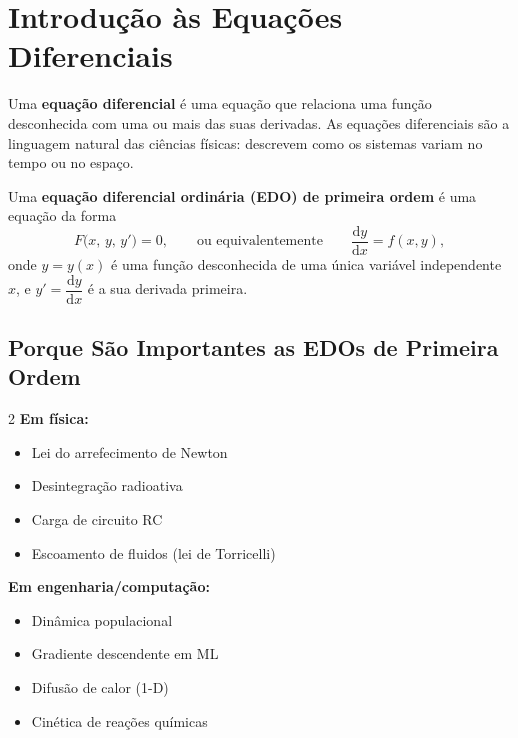 \documentclass[12pt, a4paper]{article}
\newcommand{\dd}{\mathrm{d}}
\begin{document}
\tableofcontents
\newpage

\section{Introdução às Equações Diferenciais}
\label{sec:intro}

Uma \textbf{equação diferencial} é uma equação que relaciona uma função desconhecida com
uma ou mais das suas derivadas. As equações diferenciais são a linguagem natural das
ciências físicas: descrevem como os sistemas variam no tempo ou no espaço.

\begin{defbox}
  Uma \textbf{equação diferencial ordinária (EDO) de primeira ordem} é uma equação da forma
  \[
    F\!\bigl(x,\, y,\, y'\bigr) = 0,
    \qquad\text{ou equivalentemente}\qquad
    \frac{\dd y}{\dd x} = f(x, y),
  \]
  onde $y = y(x)$ é uma função desconhecida de uma única variável independente $x$, e
  $y' = \dfrac{\dd y}{\dd x}$ é a sua derivada primeira.
\end{defbox}

\subsection{Porque São Importantes as EDOs de Primeira Ordem}

\begin{multicols}{2}
  \textbf{Em física:}
  \begin{itemize}[noitemsep]
    \item Lei do arrefecimento de Newton
    \item Desintegração radioativa
    \item Carga de circuito RC
    \item Escoamento de fluidos (lei de Torricelli)
  \end{itemize}

  \columnbreak

  \textbf{Em engenharia/computação:}
  \begin{itemize}[noitemsep]
    \item Dinâmica populacional
    \item Gradiente descendente em ML
    \item Difusão de calor (1-D)
    \item Cinética de reações químicas
  \end{itemize}
\end{multicols}
\end{document}

